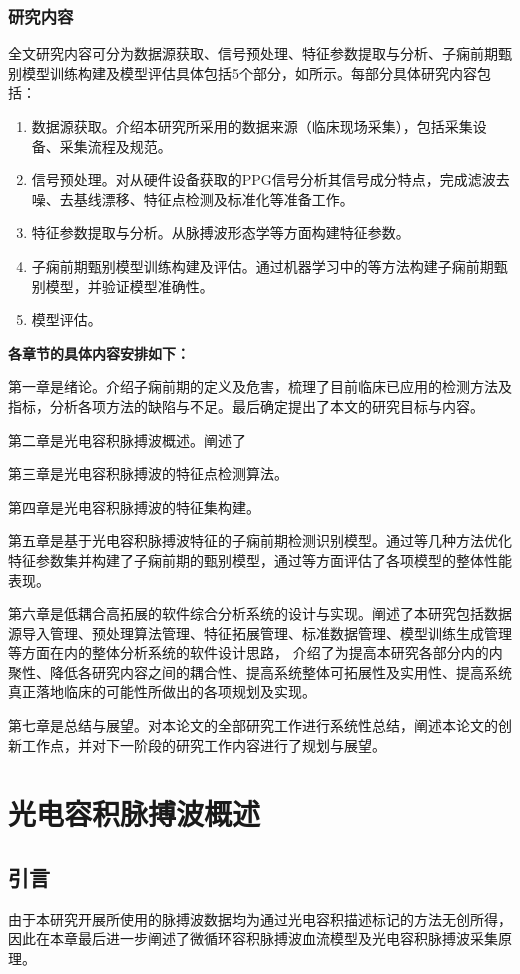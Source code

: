 \subsection{研究内容}
全文研究内容可分为数据源获取、信号预处理、特征参数提取与分析、子痫前期甄别模型训练构建及模型评估具体包括5个部分，如所示。每部分具体研究内容包括：
\begin{enumerate}
    \item 数据源获取。介绍本研究所采用的数据来源（临床现场采集），包括采集设备、采集流程及规范。  
    \item 信号预处理。对从硬件设备获取的PPG信号分析其信号成分特点，完成滤波去噪、去基线漂移、特征点检测及标准化等准备工作。
    \item 特征参数提取与分析。从脉搏波形态学等方面构建特征参数。
    \item 子痫前期甄别模型训练构建及评估。通过机器学习中的等方法构建子痫前期甄别模型，并验证模型准确性。
    \item 模型评估。
\end{enumerate}

\textbf{各章节的具体内容安排如下：}

第一章是绪论。介绍子痫前期的定义及危害，梳理了目前临床已应用的检测方法及指标，分析各项方法的缺陷与不足。最后确定提出了本文的研究目标与内容。

第二章是光电容积脉搏波概述。阐述了

第三章是光电容积脉搏波的特征点检测算法。

第四章是光电容积脉搏波的特征集构建。

第五章是基于光电容积脉搏波特征的子痫前期检测识别模型。通过等几种方法优化特征参数集并构建了子痫前期的甄别模型，通过等方面评估了各项模型的整体性能表现。

第六章是低耦合高拓展的软件综合分析系统的设计与实现。阐述了本研究包括数据源导入管理、预处理算法管理、特征拓展管理、标准数据管理、模型训练生成管理等方面在内的整体分析系统的软件设计思路，
介绍了为提高本研究各部分内的内聚性、降低各研究内容之间的耦合性、提高系统整体可拓展性及实用性、提高系统真正落地临床的可能性所做出的各项规划及实现。

第七章是总结与展望。对本论文的全部研究工作进行系统性总结，阐述本论文的创新工作点，并对下一阶段的研究工作内容进行了规划与展望。

\chapter{光电容积脉搏波概述}
\section{引言}
由于本研究开展所使用的脉搏波数据均为通过光电容积描述标记的方法无创所得，因此在本章最后进一步阐述了微循环容积脉搏波血流模型及光电容积脉搏波采集原理。
